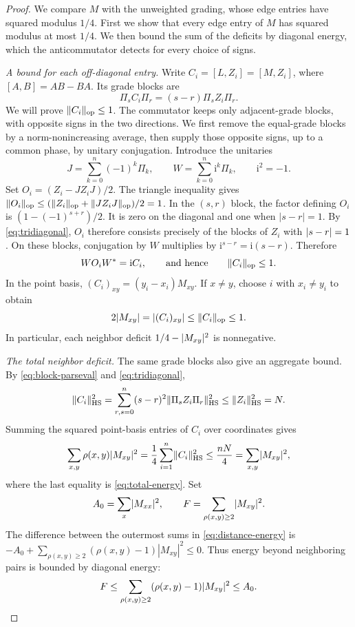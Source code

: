 \begin{proof}
We compare $M$ with the unweighted grading, whose edge entries have
squared modulus $1/4$. First we show that every edge entry of $M$ has
squared modulus at most $1/4$. We then bound the sum of the deficits by
diagonal energy, which
the anticommutator detects for every choice of signs.

\smallskip\noindent\emph{A bound for each off-diagonal entry.}
Write $C_i=[L,Z_i]=[M,Z_i]$, where $[A,B]=AB-BA$.
Its grade blocks are
\[
 \Pi_sC_i\Pi_r=(s-r)\Pi_sZ_i\Pi_r.
\]
We will prove $\lVert C_i\rVert_{\mathrm{op}}\le1$. The commutator keeps only
adjacent-grade blocks, with opposite signs in the two directions.
We first remove the equal-grade blocks by a norm-nonincreasing average,
then supply those opposite signs, up to a common phase, by unitary
conjugation. Introduce the unitaries
\[
 J=\sum_{k=0}^n(-1)^k\Pi_k,\qquad
 W=\sum_{k=0}^n\mathrm i^k\Pi_k,
 \qquad \mathrm i^2=-1.
\]
Set $O_i=(Z_i-JZ_iJ)/2$. The triangle inequality gives
$\lVert O_i\rVert_{\mathrm{op}}\le(\lVert Z_i\rVert_{\mathrm{op}}+\lVert JZ_iJ\rVert_{\mathrm{op}})/2=1$.
In the $(s,r)$ block, the factor defining $O_i$ is
$(1-(-1)^{s+r})/2$. It is zero on the diagonal and one when
$|s-r|=1$. By \eqref{eq:tridiagonal}, $O_i$ therefore consists precisely
of the blocks of $Z_i$ with
$\lvert s-r\rvert=1$. On these blocks, conjugation by $W$ multiplies by
$\mathrm i^{s-r}=\mathrm i(s-r)$. Therefore
\[
 WO_iW^*=\mathrm i C_i,
 \qquad\text{and hence}\qquad \lVert C_i\rVert_{\mathrm{op}}\le1.
\]
In the point basis, $(C_i)_{xy}=(y_i-x_i)M_{xy}$.
If $x\ne y$, choose $i$ with $x_i\ne y_i$ to obtain
\[
 2\lvert M_{xy}\rvert=\lvert (C_i)_{xy}\rvert\le\lVert C_i\rVert_{\mathrm{op}}\le1.
\]
In particular, each neighbor deficit $1/4-\lvert M_{xy}\rvert^2$ is nonnegative.

\smallskip\noindent\emph{The total neighbor deficit.}
The same grade blocks also give an aggregate bound. By
\eqref{eq:block-parseval} and \eqref{eq:tridiagonal},
\[
 \lVert C_i\rVert_{\mathrm{HS}}^2
 =\sum_{r,s=0}^n(s-r)^2\lVert \Pi_sZ_i\Pi_r\rVert_{\mathrm{HS}}^2
 \le\lVert Z_i\rVert_{\mathrm{HS}}^2=N.
\]
Summing the squared point-basis entries of $C_i$ over coordinates gives
\begin{equation}\label{eq:distance-energy}
 \sum_{x,y}\rho(x,y)\lvert M_{xy}\rvert^2
 =\frac14\sum_{i=1}^n\lVert C_i\rVert_{\mathrm{HS}}^2
 \le\frac{nN}{4}=\sum_{x,y}\lvert M_{xy}\rvert^2,
\end{equation}
where the last equality is \eqref{eq:total-energy}. Set
\[
 A_0=\sum_x\lvert M_{xx}\rvert^2,\qquad
 F=\sum_{\rho(x,y)\ge2}\lvert M_{xy}\rvert^2.
\]
The difference between the outermost sums in
\eqref{eq:distance-energy} is
$-A_0+\sum_{\rho(x,y)\ge2}(\rho(x,y)-1)|M_{xy}|^2\le0$.
Thus energy beyond neighboring pairs is bounded by diagonal energy:
\begin{equation}\label{eq:far-energy}
 F\le\sum_{\rho(x,y)\ge2}(\rho(x,y)-1)\lvert M_{xy}\rvert^2\le A_0.
\end{equation}


\end{proof}
